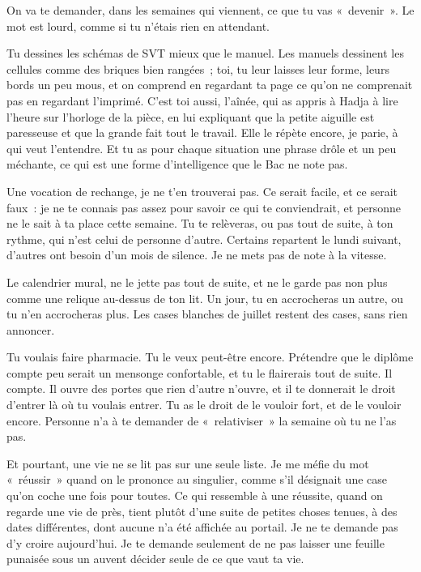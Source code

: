 \documentclass[10.5pt,twoside,openright]{book}
\begin{document}
On va te demander, dans les semaines qui viennent, ce que tu vas « devenir ». Le mot est lourd, comme si tu n’étais rien en attendant.

Tu dessines les schémas de SVT mieux que le manuel. Les manuels dessinent les cellules comme des briques bien rangées ; toi, tu leur laisses leur forme, leurs bords un peu mous, et on comprend en regardant ta page ce qu’on ne comprenait pas en regardant l’imprimé. C’est toi aussi, l’aînée, qui as appris à Hadja à lire l’heure sur l’horloge de la pièce, en lui expliquant que la petite aiguille est paresseuse et que la grande fait tout le travail. Elle le répète encore, je parie, à qui veut l’entendre. Et tu as pour chaque situation une phrase drôle et un peu méchante, ce qui est une forme d’intelligence que le Bac ne note pas.

Une vocation de rechange, je ne t’en trouverai pas. Ce serait facile, et ce serait faux : je ne te connais pas assez pour savoir ce qui te conviendrait, et personne ne le sait à ta place cette semaine. Tu te relèveras, ou pas tout de suite, à ton rythme, qui n’est celui de personne d’autre. Certains repartent le lundi suivant, d’autres ont besoin d’un mois de silence. Je ne mets pas de note à la vitesse.

Le calendrier mural, ne le jette pas tout de suite, et ne le garde pas non plus comme une relique au-dessus de ton lit. Un jour, tu en accrocheras un autre, ou tu n’en accrocheras plus. Les cases blanches de juillet restent des cases, sans rien annoncer.

Tu voulais faire pharmacie. Tu le veux peut-être encore. Prétendre que le diplôme compte peu serait un mensonge confortable, et tu le flairerais tout de suite. Il compte. Il ouvre des portes que rien d’autre n’ouvre, et il te donnerait le droit d’entrer là où tu voulais entrer. Tu as le droit de le vouloir fort, et de le vouloir encore. Personne n’a à te demander de « relativiser » la semaine où tu ne l’as pas.

Et pourtant, une vie ne se lit pas sur une seule liste. Je me méfie du mot « réussir » quand on le prononce au singulier, comme s’il désignait une case qu’on coche une fois pour toutes. Ce qui ressemble à une réussite, quand on regarde une vie de près, tient plutôt d’une suite de petites choses tenues, à des dates différentes, dont aucune n’a été affichée au portail. Je ne te demande pas d’y croire aujourd’hui. Je te demande seulement de ne pas laisser une feuille punaisée sous un auvent décider seule de ce que vaut ta vie.
\end{document}
